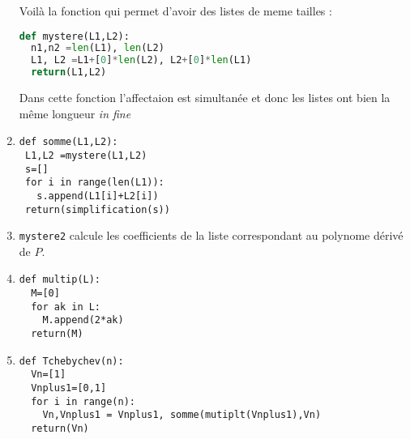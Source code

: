 \documentclass[a4paper, 11pt,reqno]{article}
\begin{document}
\begin{correction}
\begin{enumerate}
Voilà la fonction qui permet d'avoir des listes de meme tailles : 


\begin{lstlisting}[language =Python]
def mystere(L1,L2):
  n1,n2 =len(L1), len(L2)
  L1, L2 =L1+[0]*len(L2), L2+[0]*len(L1)
  return(L1,L2) 
\end{lstlisting}
Dans cette fonction l'affectaion est simultanée et donc les listes ont bien la même longueur \emph{in fine}


\item 
\begin{lstlisting}
def somme(L1,L2):
 L1,L2 =mystere(L1,L2)
 s=[]
 for i in range(len(L1)):
   s.append(L1[i]+L2[i])
 return(simplification(s))
\end{lstlisting}
\item 
\texttt{mystere2} calcule les coefficients de la liste correspondant au polynome dérivé de $P$. 
\item 
\begin{lstlisting}
def multip(L):
  M=[0]
  for ak in L:
    M.append(2*ak)
  return(M)
\end{lstlisting}
\item 
\begin{lstlisting}
def Tchebychev(n):
  Vn=[1]
  Vnplus1=[0,1]
  for i in range(n):
    Vn,Vnplus1 = Vnplus1, somme(mutiplt(Vnplus1),Vn)
  return(Vn)
\end{lstlisting}
\end{enumerate}

\end{correction}
\end{document}
